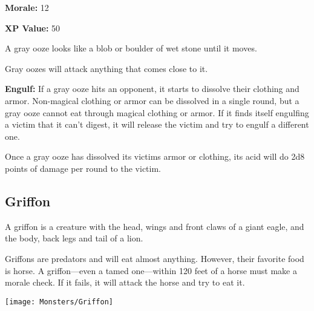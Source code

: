 \begin{multicols*}{2}
{{\textbf{Morale:} 12

\textbf{XP Value:} 50}}

A gray ooze looks like a blob or boulder of wet stone until it moves.

Gray oozes will attack anything that comes close to it.

\textbf{Engulf:} If a gray ooze hits an opponent, it starts to dissolve their clothing and armor. Non-magical clothing or armor can be dissolved in a single round, but a gray ooze cannot eat through magical clothing or armor. If it finds itself engulfing a victim that it can’t digest, it will release the victim and try to engulf a different one.

Once a gray ooze has dissolved its victims armor or clothing, its acid will do 2d8 points of damage per round to the victim.

\subsection{Griffon}\label{monster:Griffon}

A griffon is a creature with the head, wings and front claws of a giant eagle, and the body, back legs and tail of a lion.

Griffons are predators and will eat almost anything. However, their favorite food is horse. A griffon—even a tamed one—within 120 feet of a horse must make a morale check. If it fails, it will attack the horse and try to eat it.

\texttt{[image: Monsters/Griffon]}


\end{multicols*}

